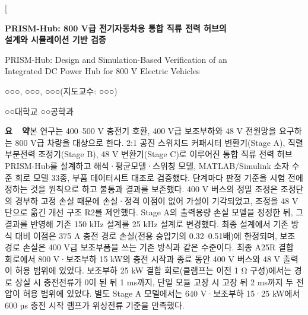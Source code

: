 \documentclass[10pt,a4paper,twocolumn]{article}
\newcommand{\fillin}[1]{{\color{ph}#1}}
\begin{document}
\twocolumn[{%
\begin{center}
{\sffamily\bfseries\Large PRISM-Hub: 800 V급 전기자동차용 통합 직류 전력 허브의\\[1mm] 설계와 시뮬레이션 기반 검증\par}
\vspace{2mm}
{\sffamily\normalsize PRISM-Hub: Design and Simulation-Based Verification of an\\ Integrated DC Power Hub for 800 V Electric Vehicles\par}
\vspace{3mm}
{\normalsize \fillin{○○○}, \fillin{○○○}, \fillin{○○○}\quad(지도교수: \fillin{○○○})\par}
\vspace{1mm}
{\small \fillin{○○대학교 ○○공학과}\par}
\vspace{4mm}
\begin{minipage}{0.92\textwidth}
\small
\textbf{요\ \ 약}\quad 본 연구는 400–500 V 충전기 호환, 400 V급 보조부하와 48 V 전원망을 요구하는 800 V급 차량을 대상으로 한다. 2:1 공진 스위치드 커패시터 변환기(Stage A), 직렬 부분전력 조정기(Stage B), 48 V 변환기(Stage C)로 이루어진 통합 직류 전력 허브 PRISM-Hub를 설계하고 해석·평균모델·스위칭 모델, MATLAB/Simulink 소자 수준 회로 모델 33종, 부품 데이터시트 대조로 검증했다. 단계마다 판정 기준을 시험 전에 정하는 것을 원칙으로 하고 불통과 결과를 보존했다. 400 V 버스의 정밀 조정은 조정단의 경부하 고정 손실 때문에 손실·정격 이점이 없어 가설이 기각되었고, 조정을 48 V 단으로 옮긴 개선 구조 R2를 제안했다. Stage A의 출력용량 손실 모델을 정정한 뒤, 그 결과를 반영해 기존 150 kHz 설계를 25 kHz 설계로 변경했다. 최종 설계에서 기존 방식 대비 이점은 375 A 충전 경로 손실(전용 승압기의 0.32–0.51배)에 한정되며, 보조 경로 손실은 400 V급 보조부품을 쓰는 기존 방식과 같은 수준이다. 최종 A25R 결합 회로에서 800 V·보조부하 15 kW의 충전 시작과 종료 동안 400 V 버스와 48 V 출력이 허용 범위에 있었다. 보조부하 25 kW 결합 회로(클램프는 이전 1 Ω 구성)에서는 경로 상실 시 충전전류가 0이 된 뒤 1 ms까지, 단일 모듈 고장 시 고장 뒤 2 ms까지 두 전압이 허용 범위에 있었다. 별도 Stage A 모델에서는 640 V·보조부하 15·25 kW에서 600 µs 충전 시작 램프가 위상전류 기준을 만족했다.


\end{minipage}
\end{center}}
\end{document}
